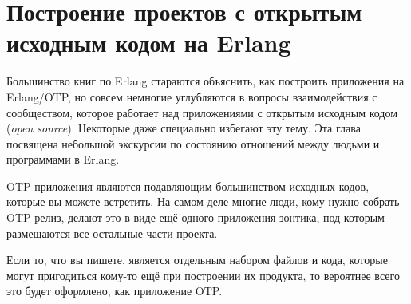 
\chapter{Построение проектов с открытым исходным кодом на Erlang}
\label{chap:building-open-source-erlang-software}

Большинство книг по Erlang стараются объяснить, как построить приложения на Erlang/OTP, но совсем немногие углубляются в вопросы взаимодействия с сообществом, которое работает над приложениями с открытым исходным кодом (\emph{open source}). Некоторые даже специально избегают эту тему. Эта глава посвящена небольшой экскурсии по состоянию отношений между людьми и программами в Erlang.

OTP-приложения являются подавляющим большинством исходных кодов, которые вы можете встретить. На самом деле многие люди, кому нужно собрать OTP-релиз, делают это в виде ещё одного приложения-зонтика, под которым размещаются все остальные части проекта.

Если то, что вы пишете, является отдельным набором файлов и кода, которые могут пригодиться кому-то ещё при построении их продукта, то вероятнее всего это будет оформлено, как приложение OTP.

